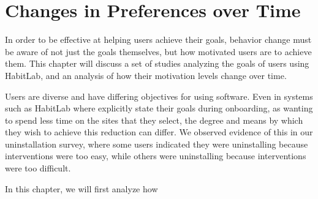 \chapter{Changes in Preferences over Time}

In order to be effective at helping users achieve their goals, behavior change must be aware of not just the goals themselves, but how motivated users are to achieve them. This chapter will discuss a set of studies analyzing the goals of users using HabitLab, and an analysis of how their motivation levels change over time.

Users are diverse and have differing objectives for using software. Even in systems such as HabitLab where explicitly state their goals during onboarding, as wanting to spend less time on the sites that they select, the degree and means by which they wish to achieve this reduction can differ. We observed evidence of this in our uninstallation survey, where some users indicated they were uninstalling because interventions were too easy, while others were uninstalling because interventions were too difficult.

In this chapter, we will first analyze how 
